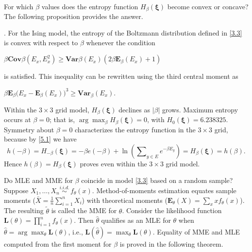 \documentclass[twoside]{article}
\begin{document}
For which $\beta$ values does the entropy function ${{H}_{\beta }}(\boldsymbol{\xi })$ become convex or concave? The following proposition provides the answer.

\begin{pro} \label{pro3.5}
\citep{shams}. For the Ising model, the entropy of the Boltzmann distribution defined in \eqref{3.3} is convex with respect to $\beta$ whenever the condition
\begin{small}
$\beta \mathbf{Cov}{\beta} \left( E_x, E_x^2 \right) \geq \mathbf{Var}{\beta} \left( E_x \right) \left( 2\beta \boldsymbol{E}_{\beta} \left( E_x \right) + 1 \right)$
\end{small}
is satisfied.
This inequality can be rewritten using the third central moment as
\begin{small}
$\beta {\boldsymbol{E}_{\beta}}{{\Big( {{E}_{x}}-{\boldsymbol{E}_{\beta}}\left( {{E}_{x}} \right) \Big)}^{3}} \ge {{\boldsymbol{Var}}_{\beta}}\left( E_{x}^{{}} \right)$.
\end{small}
\end{pro}

Within the $3\times 3$ grid model, ${{H}_{\beta }}(\boldsymbol{\xi })$ declines as $\left| \beta \right|$ grows. Maximum entropy occurs at $\beta =0$; that is, $\arg {{\max }_{\beta }}{{H}_{\beta }}(\boldsymbol{\xi })=0$, with ${{H}_{0}}(\boldsymbol{\xi })=6.238325$. Symmetry about $\beta =0$ characterizes the entropy function in the $3\times 3$ grid, because by \eqref{5.1} we have
\[h(-\beta) = {{H}_{-\beta }}(\boldsymbol{\xi }) = -\beta e(-\beta) + \ln \left( \sum\nolimits_{y\in E}{{{e}^{-\beta {{E}_{y}}}}} \right) = {{H}_{\beta }}(\boldsymbol{\xi }) = h(\beta).\]
Hence $h(\beta )={{H}_{\beta }}(\boldsymbol{\xi })$ proves even within the $3\times 3$ grid model.

Do MLE and MME for $\beta$ coincide in model \eqref{3.3} based on a random sample? Suppose ${{X}_{1}},\ldots,{{X}_{n}}\overset{i.i.d.}{\mathop{\sim }}\,{{f}_{\theta }}(x)$. Method-of-moments estimation equates sample moments ($\bar{X}=\tfrac{1}{n}\sum\nolimits_{i=1}^{n}{{{X}_{i}}}$) with theoretical moments (${\boldsymbol{E}_{\theta }}\left( X \right)=\sum\nolimits_{x}{x{{f}_{\theta }}(x)}$). The resulting $\tilde{\theta }$ is called the MME for $\theta$. Consider the likelihood function $\boldsymbol{L} \left( \theta \right)=\prod\nolimits_{i=1}^{n}{{{f}_{\theta }}(x)}$. Then $\hat{\theta }$ qualifies as an MLE for $\theta$ when $\hat{\theta} = \arg\max_{\theta} \boldsymbol{L}(\theta)$, i.e., $\boldsymbol{L}(\hat{\theta}) = \max_{\theta} \boldsymbol{L}(\theta)$. Equality of MME and MLE computed from the first moment for $\beta$ is proved in the following theorem.
\end{document}
